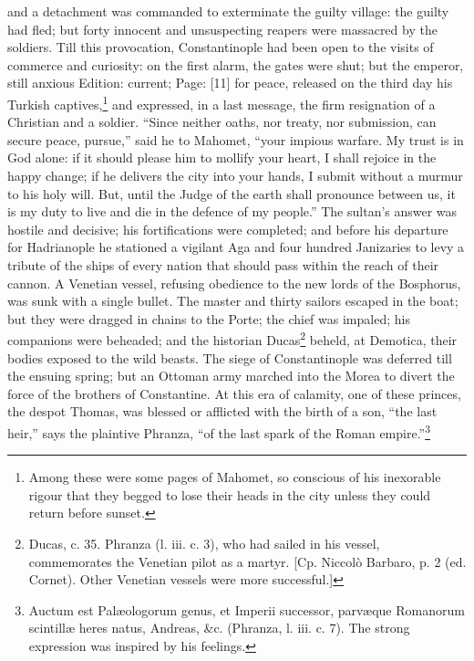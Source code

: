 and a detachment was commanded to exterminate the guilty village: the guilty had fled; but forty innocent and unsuspecting reapers were massacred by the soldiers. Till this provocation, Constantinople had been open to the visits of commerce and curiosity: on the first alarm, the gates were shut; but the emperor, still anxious Edition: current; Page: [11] for peace, released on the third day his Turkish captives,\footnote{Among these were some pages of Mahomet, so conscious of his inexorable rigour that they begged to lose their heads in the city unless they could return before sunset.} and expressed, in a last message, the firm resignation of a Christian and a soldier. \texthebrew{“}Since neither oaths, nor treaty, nor submission, can secure peace, pursue,\texthebrew{}” said he to Mahomet, \texthebrew{“}your impious warfare. My trust is in God alone: if it should please him to mollify your heart, I shall rejoice in the happy change; if he delivers the city into your hands, I submit without a murmur to his holy will. But, until the Judge of the earth shall pronounce between us, it is my duty to live and die in the defence of my people.\texthebrew{}” The sultan\texthebrew{}’s answer was hostile and decisive; his fortifications were completed; and before his departure for Hadrianople he stationed a vigilant Aga and four hundred Janizaries to levy a tribute of the ships of every nation that should pass within the reach of their cannon. A Venetian vessel, refusing obedience to the new lords of the Bosphorus, was sunk with a single bullet. The master and thirty sailors escaped in the boat; but they were dragged in chains to the Porte; the chief was impaled; his companions were beheaded; and the historian Ducas\footnote{Ducas, c. 35. Phranza (l. iii. c. 3), who had sailed in his vessel, commemorates the Venetian pilot as a martyr. [Cp. Niccolò Barbaro, p. 2 (ed. Cornet). Other Venetian vessels were more successful.]} beheld, at Demotica, their bodies exposed to the wild beasts. The siege of Constantinople was deferred till the ensuing spring; but an Ottoman army marched into the Morea to divert the force of the brothers of Constantine. At this era of calamity, one of these princes, the despot Thomas, was blessed or afflicted with the birth of a son, \texthebrew{“}the last heir,\texthebrew{}” says the plaintive Phranza, \texthebrew{“}of the last spark of the Roman empire.\texthebrew{}”\footnote{Auctum est Palæologorum genus, et Imperii successor, parvæque Romanorum scintillæ heres natus, Andreas, \&c. (Phranza, l. iii. c. 7). The strong expression was inspired by his feelings.}

